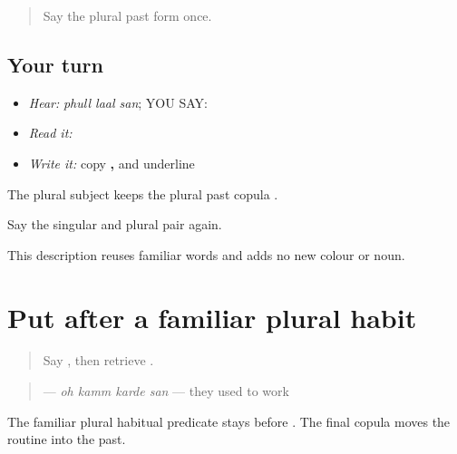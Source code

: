 \label{lesson:PA-C187-san-description}



\begin{quote}
Say the plural past form once.
\end{quote}

\subsection*{Your turn}
\begin{itemize}
\raggedright
  \item \emph{Hear:} \emph{phull laal san}; YOU SAY: \textbf{  }
  \item \emph{Read it:} \textbf{  }
  \item \emph{Write it:} copy \textbf{, } and underline \textbf{}
\end{itemize}

The plural subject \textbf{} keeps the plural past copula \textbf{}.

\begin{tcolorbox}[breakable,colback=teal!4,colframe=teal!35!black,title={Before you move on}]
Say the singular and plural pair again.

This description reuses familiar words and adds no new colour or noun.
\end{tcolorbox}
\section[\texorpdfstring{\pa{ਉਹ} \pa{ਕੰਮ} \pa{ਕਰਦੇ} \pa{ਸਨ} (oh kamm karde san)}{ਉਹ ਕੰਮ ਕਰਦੇ ਸਨ (oh kamm karde san)}]{Put  after a familiar plural habit}

\label{lesson:PA-C187-san-habitual}



\begin{quote}
Say \textbf{  }, then retrieve \textbf{}.
\end{quote}

\begin{grammarlens}[title={Grammar Lens: a familiar habit moved into the past}]
\begin{quote}
\textbf{   } — \emph{oh kamm karde san} — they used to work
\end{quote}

The familiar plural habitual predicate stays before \textbf{}. The final copula moves the routine into the past.
\end{grammarlens}

